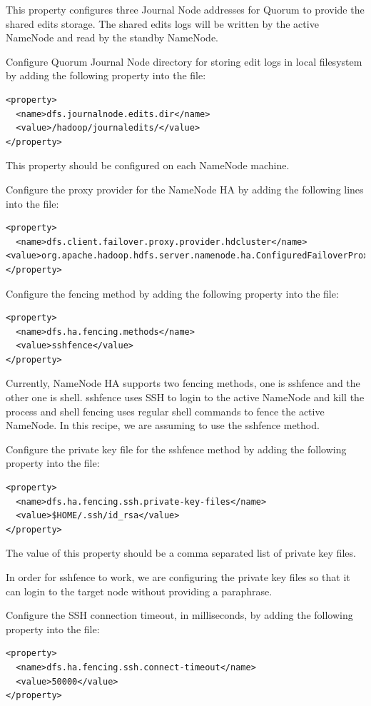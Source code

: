 This property configures three Journal Node addresses for Quorum to provide the shared edits storage. The shared edits logs will be written by the active NameNode and read by the standby NameNode.

Configure Quorum Journal Node directory for storing edit logs in local filesystem by adding the following property into the file:
\lstset{style=bashstyle}
\begin{lstlisting}
<property>
  <name>dfs.journalnode.edits.dir</name>
  <value>/hadoop/journaledits/</value>
</property>
\end{lstlisting}

This property should be configured on each NameNode machine.

Configure the proxy provider for the NameNode HA by adding the following lines into the file:
\lstset{style=bashstyle}
\begin{lstlisting}
<property>
  <name>dfs.client.failover.proxy.provider.hdcluster</name>
<value>org.apache.hadoop.hdfs.server.namenode.ha.ConfiguredFailoverProxyProvider</value>
</property>
\end{lstlisting}

Configure the fencing method by adding the following property into the file:
\lstset{style=bashstyle}
\begin{lstlisting}
<property>
  <name>dfs.ha.fencing.methods</name>
  <value>sshfence</value>
</property>
\end{lstlisting}

Currently, NameNode HA supports two fencing methods, one is sshfence and the other one is shell. sshfence uses SSH to login to the active NameNode and kill the process and shell fencing uses regular shell commands to fence the active NameNode. In this recipe, we are assuming to use the sshfence method.

Configure the private key file for the sshfence method by adding the following property into the file:
\lstset{style=bashstyle}
\begin{lstlisting}
<property>
  <name>dfs.ha.fencing.ssh.private-key-files</name>
  <value>$HOME/.ssh/id_rsa</value>
</property>
\end{lstlisting}

The value of this property should be a comma separated list of private key files.

In order for sshfence to work, we are configuring the private key files so that it can login to the target node without providing a paraphrase.

Configure the SSH connection timeout, in milliseconds, by adding the following property into the file:
\lstset{style=bashstyle}
\begin{lstlisting}
<property>
  <name>dfs.ha.fencing.ssh.connect-timeout</name>
  <value>50000</value>
</property>
\end{lstlisting}

